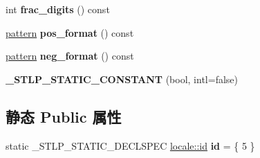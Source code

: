 \begin{DoxyCompactItemize}
int {\bfseries frac\+\_\+digits} () const
\item 
\mbox{\label{classmoneypunct_3_01char_00_01false_01_4_ab1ade3558c969c54370a0e6ac52750c0}} 
\hyperlink{structmoney__base_1_1pattern}{pattern} {\bfseries pos\+\_\+format} () const
\item 
\mbox{\label{classmoneypunct_3_01char_00_01false_01_4_aacebccf1038ccf9def1f393c85c0609d}} 
\hyperlink{structmoney__base_1_1pattern}{pattern} {\bfseries neg\+\_\+format} () const
\item 
\mbox{\label{classmoneypunct_3_01char_00_01false_01_4_a0c78eb105729648dff910d56a55a0c61}} 
{\bfseries \+\_\+\+S\+T\+L\+P\+\_\+\+S\+T\+A\+T\+I\+C\+\_\+\+C\+O\+N\+S\+T\+A\+NT} (bool, intl=false)
\end{DoxyCompactItemize}
\subsection*{静态 Public 属性}
\begin{DoxyCompactItemize}
\item 
\mbox{\label{classmoneypunct_3_01char_00_01false_01_4_a30d87fb6aa9fb5e52779a87cd8885b2f}} 
static \+\_\+\+S\+T\+L\+P\+\_\+\+S\+T\+A\+T\+I\+C\+\_\+\+D\+E\+C\+L\+S\+P\+EC \hyperlink{classlocale_1_1id}{locale\+::id} {\bfseries id} = \{ 5 \}
\end{DoxyCompactItemize}
